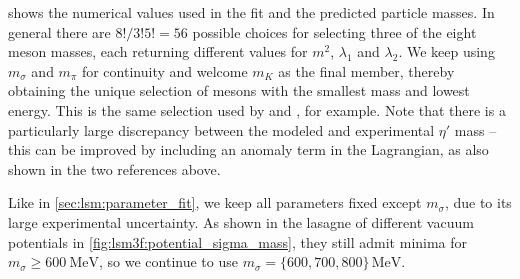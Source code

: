 shows the numerical values used in the fit and the predicted particle masses.
In general there are $8!/3!5! = 56$ possible choices for selecting three of the eight meson masses,
each returning different values for $m^2$, $\lambda_1$ and $\lambda_2$.
We keep using $m_\sigma$ and $m_\pi$ for continuity and welcome $m_K$ as the final member, thereby obtaining the unique selection of mesons with the smallest mass and lowest energy.
This is the same selection used by \cite{ref:lsm3f} and \cite{ref:lsm3f_details}, for example.
Note that there is a particularly large discrepancy between the modeled and experimental $\eta'$ mass
-- this can be improved by including an anomaly term in the Lagrangian, as also shown in the two references above.

Like in \cref{sec:lsm:parameter_fit},
we keep all parameters fixed except $m_\sigma$, due to its large experimental uncertainty.
As shown in the lasagne of different vacuum potentials in \cref{fig:lsm3f:potential_sigma_mass},
they still admit minima for $m_\sigma \geq \SI{600}{\mega\electronvolt}$,
so we continue to use $m_\sigma=\{600,700,800\} \, \si{\mega\electronvolt}$.

